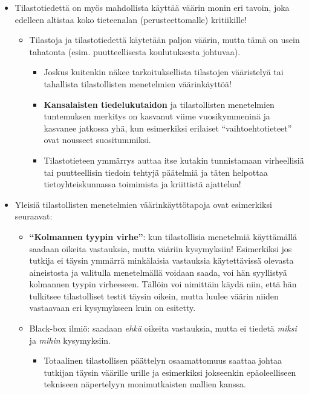 \documentclass[
]{book}
\providecommand{\tightlist}{%
  \setlength{\itemsep}{0pt}\setlength{\parskip}{0pt}}
\begin{document}
\begin{itemize}
\tightlist
\item
  Tilastotiedettä on myös mahdollista käyttää väärin monin eri tavoin, joka edelleen altistaa koko tieteenalan (perusteettomalle) kritiikille!

  \begin{itemize}
  \tightlist
  \item
    Tilastoja ja tilastotiedettä käytetään paljon väärin, mutta tämä on usein tahatonta (esim. puutteellisesta koulutuksesta johtuvaa).

    \begin{itemize}
    \tightlist
    \item
      Joskus kuitenkin näkee tarkoituksellista tilastojen vääristelyä tai tahallista tilastollisten menetelmien väärinkäyttöä!
    \item
      \textbf{Kansalaisten tiedelukutaidon} ja tilastollisten menetelmien tuntemuksen merkitys on kasvanut viime vuosikymmeninä ja kasvanee jatkossa yhä, kun esimerkiksi erilaiset ``vaihtoehtotieteet'' ovat nousseet suositummiksi.
    \item
      Tilastotieteen ymmärrys auttaa itse kutakin tunnistamaan virheellisiä tai puutteellisin tiedoin tehtyjä päätelmiä ja täten helpottaa tietoyhteiskunnassa toimimista ja kriittistä ajattelua!
    \end{itemize}
  \end{itemize}
\item
  Yleisiä tilastollisten menetelmien väärinkäyttötapoja ovat esimerkiksi seuraavat:

  \begin{itemize}
  \tightlist
  \item
    \textbf{``Kolmannen tyypin virhe''}: kun tilastollisia menetelmiä käyttämällä saadaan oikeita vastauksia, mutta vääriin kysymyksiin! Esimerkiksi jos tutkija ei täysin ymmärrä minkälaisia vastauksia käytettävissä olevasta aineistosta ja valitulla menetelmällä voidaan saada, voi hän syyllistyä kolmannen tyypin virheeseen. Tällöin voi nimittäin käydä niin, että hän tulkitsee tilastolliset testit täysin oikein, mutta luulee väärin niiden vastaavaan eri kysymykseen kuin on esitetty.
  \item
    Black-box ilmiö: saadaan \emph{ehkä} oikeita vastauksia, mutta ei tiedetä \emph{miksi} ja \emph{mihin} kysymyksiin.

    \begin{itemize}
    \tightlist
    \item
      Totaalinen tilastollisen päättelyn osaamattomuus saattaa johtaa tutkijan täysin väärille urille ja esimerkiksi jokseenkin epäoleelliseen tekniseen näpertelyyn monimutkaisten mallien kanssa.
    \end{itemize}
  \end{itemize}
\end{itemize}
\end{document}
